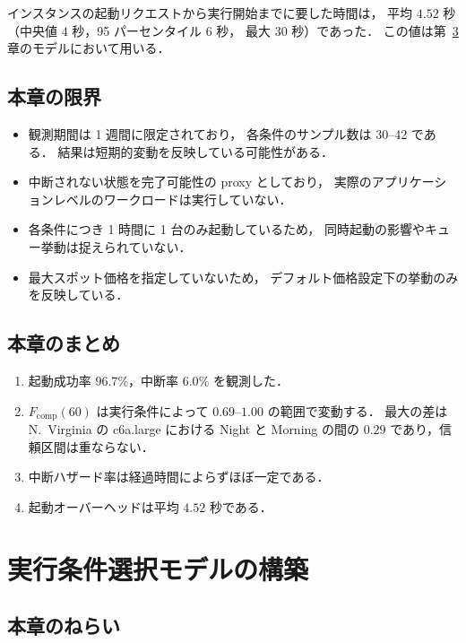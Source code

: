 \documentclass[11pt,a4paper]{ltjsreport}
\newcommand{\Fcomp}{F_{\mathrm{comp}}}
\begin{document}
インスタンスの起動リクエストから実行開始までに要した時間は，
平均 $4.52$ 秒（中央値 $4$ 秒，95 パーセンタイル $6$ 秒，
最大 $30$ 秒）であった．
この値は第~\ref{chap:model} 章のモデルにおいて用いる．

\section{本章の限界}
\label{sec:limit_measure}

\begin{itemize}
  \item 観測期間は 1 週間に限定されており，
        各条件のサンプル数は 30--42 である．
        結果は短期的変動を反映している可能性がある．
  \item 中断されない状態を完了可能性の proxy としており，
        実際のアプリケーションレベルのワークロードは実行していない．
  \item 各条件につき 1 時間に 1 台のみ起動しているため，
        同時起動の影響やキュー挙動は捉えられていない．
  \item 最大スポット価格を指定していないため，
        デフォルト価格設定下の挙動のみを反映している．
\end{itemize}

\section{本章のまとめ}

\begin{enumerate}
  \item 起動成功率 $96.7\%$，中断率 $6.0\%$ を観測した．
  \item $\Fcomp(60)$ は実行条件によって $0.69$--$1.00$ の範囲で変動する．
        最大の差は N.~Virginia の c6a.large における
        Night と Morning の間の $0.29$ であり，信頼区間は重ならない．
  \item 中断ハザード率は経過時間によらずほぼ一定である．
  \item 起動オーバーヘッドは平均 $4.52$ 秒である．
\end{enumerate}

\chapter{実行条件選択モデルの構築}
\label{chap:model}

\section{本章のねらい}
\end{document}
